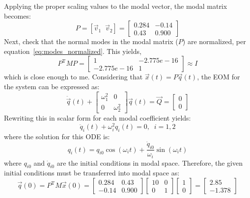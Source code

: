 \documentclass[12pt,letter]{article}
\begin{document}
\begin{example}
	Applying the proper scaling values to the modal vector, the modal matrix becomes:
	\begin{equation}
		P = [ \vec{v}_1 \; \; \vec{v}_2 ] = \begin{bmatrix} 0.284 & -0.14 \\    0.43  & 0.900 \end{bmatrix}
	\end{equation}
	Next, check that the normal modes in the modal matrix ($P$) are normalized, per equation~\ref{eq:modes_normalized}. This yields,
	\begin{equation}
		P^{\text{T}} M P = \begin{bmatrix} 1 & -2.775e-16 \\   -2.775e-16 & 1 \end{bmatrix} \approx I
	\end{equation}
	which is close enough to me. Considering that $\vec{x}(t) = P\vec{q}(t)$, the EOM for the system can be expressed as:
	\begin{equation}
		\ddot{\vec{q}}(t) + \begin{bmatrix} \omega_1^2 & 0 \\    0  & \omega_2^2 \end{bmatrix} \vec{q} (t) = \vec{Q} = \begin{bmatrix} 0 \\  0  \end{bmatrix} 
	\end{equation}
	Rewriting this in scalar form for each modal coefficient yields:
	\begin{equation}
		\ddot{q}_i(t) + \omega_i^2 q_i (t) = 0, \; \; i=1,2
	\end{equation}
	where the solution for this ODE is:
	\begin{equation}
		q_i(t) = q_{i0} \cos(\omega_i t) +  \frac{\dot{q}_{i0}}{\omega_i} \sin( \omega_i t)
	\end{equation}
	where $q_{i0}$ and $\dot{q}_{i0}$ are the initial conditions in modal space. Therefore, the given initial conditions must be transferred into modal space as:
	\begin{equation}
		\vec{q}(0) = P^\text{T} M \vec{x}(0) = \begin{bmatrix} 0.284 &  0.43 \\  -0.14    & 0.900 \end{bmatrix} \begin{bmatrix} 10 & 0 \\  0  & 1 \end{bmatrix}  \begin{bmatrix} 1 \\  0 \end{bmatrix} =  \begin{bmatrix}  2.85 \\  -1.378 \end{bmatrix}

\end{equation}
\end{example}
\end{document}
